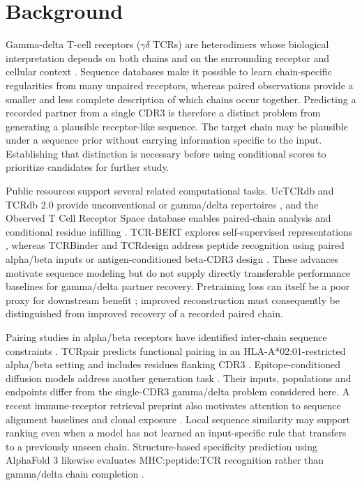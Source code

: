 \documentclass[a4paper,11pt]{article}
\newcommand{\gd}{\ensuremath{\gamma\delta}}
\begin{document}
\section{Background}
Gamma-delta T-cell receptors (\gd{} TCRs) are heterodimers whose biological
interpretation depends on both chains and on the surrounding receptor and
cellular context \cite{gd_review}. Sequence databases make it possible to learn
chain-specific regularities from many unpaired receptors, whereas paired
observations provide a smaller and less complete description of which chains
occur together. Predicting a recorded partner from a single CDR3 is therefore
a distinct problem from generating a plausible receptor-like sequence.
The target chain may be plausible under a sequence prior without carrying
information specific to the input. Establishing that distinction is necessary
before using conditional scores to prioritize candidates for further study.

Public resources support several related computational tasks. UcTCRdb and
TCRdb 2.0 provide unconventional or gamma/delta repertoires
\cite{uctcrdb,tcrdb2}, and the Observed T Cell Receptor Space database enables
paired-chain analysis and conditional residue infilling \cite{ots}.
TCR-BERT explores self-supervised representations \cite{tcrbert}, whereas
TCRBinder and TCRdesign address peptide recognition using paired alpha/beta
inputs or antigen-conditioned beta-CDR3 design \cite{tcrbinder,tcrdesign}.
These advances motivate sequence modeling but do not supply directly
transferable performance baselines for gamma/delta partner recovery.
Pretraining loss can itself be a poor proxy for downstream benefit
\cite{landry2025}; improved reconstruction must consequently be distinguished
from improved recovery of a recorded paired chain.

Pairing studies in alpha/beta receptors have identified inter-chain sequence
constraints \cite{pairing_constraints}. TCRpair predicts functional pairing
in an HLA-A*02:01-restricted alpha/beta setting and includes residues flanking
CDR3 \cite{tcrpair}. Epitope-conditioned diffusion models address another
generation task \cite{dtcr}. Their inputs, populations and endpoints differ
from the single-CDR3 gamma/delta problem considered here. A recent
immune-receptor retrieval preprint also motivates attention to sequence
alignment baselines and clonal exposure \cite{germline_shortcut}.
Local sequence similarity may support ranking even when a model has not
learned an input-specific rule that transfers to a previously unseen chain.
Structure-based specificity prediction using AlphaFold 3 likewise evaluates
MHC:peptide:TCR recognition rather than gamma/delta chain completion
\cite{af3_specificity}.
\end{document}
